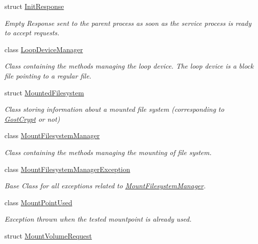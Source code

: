 \begin{DoxyCompactItemize}
struct \hyperlink{struct_gost_crypt_1_1_core_1_1_init_response}{Init\+Response}
\begin{DoxyCompactList}\small\item\em Empty Response sent to the parent process as soon as the service process is ready to accept requests. \end{DoxyCompactList}\item 
class \hyperlink{class_gost_crypt_1_1_core_1_1_loop_device_manager}{Loop\+Device\+Manager}
\begin{DoxyCompactList}\small\item\em Class containing the methods managing the loop device. The loop device is a block file pointing to a regular file. \end{DoxyCompactList}\item 
struct \hyperlink{struct_gost_crypt_1_1_core_1_1_mounted_filesystem}{Mounted\+Filesystem}
\begin{DoxyCompactList}\small\item\em Class storing information about a mounted file system (corresponding to \hyperlink{namespace_gost_crypt}{Gost\+Crypt} or not) \end{DoxyCompactList}\item 
class \hyperlink{class_gost_crypt_1_1_core_1_1_mount_filesystem_manager}{Mount\+Filesystem\+Manager}
\begin{DoxyCompactList}\small\item\em Class containing the methods managing the mounting of file system. \end{DoxyCompactList}\item 
class \hyperlink{class_gost_crypt_1_1_core_1_1_mount_filesystem_manager_exception}{Mount\+Filesystem\+Manager\+Exception}
\begin{DoxyCompactList}\small\item\em Base Class for all exceptions related to \hyperlink{class_gost_crypt_1_1_core_1_1_mount_filesystem_manager}{Mount\+Filesystem\+Manager}. \end{DoxyCompactList}\item 
class \hyperlink{class_gost_crypt_1_1_core_1_1_mount_point_used}{Mount\+Point\+Used}
\begin{DoxyCompactList}\small\item\em Exception thrown when the tested mountpoint is already used. \end{DoxyCompactList}\item 
struct \hyperlink{struct_gost_crypt_1_1_core_1_1_mount_volume_request}{Mount\+Volume\+Request}

\end{DoxyCompactItemize}
